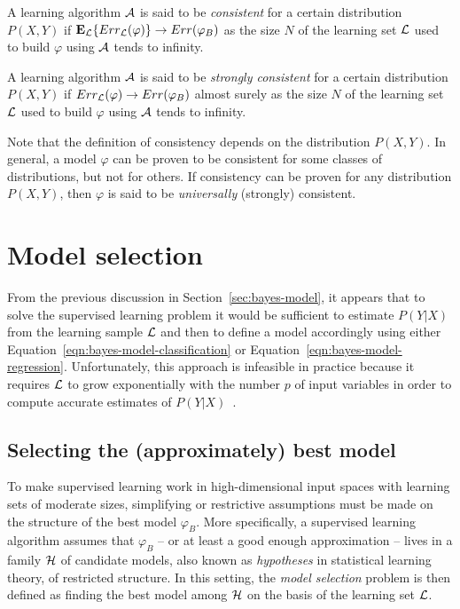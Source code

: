\begin{definition}
A learning algorithm ${\cal A}$ is said to be \emph{consistent} for a certain distribution
$P(X, Y)$ if $\mathbf{E}_{\cal L} \{ Err_{\cal L}(\varphi) \} \to Err(\varphi_B)$
as the size $N$ of the learning set ${\cal L}$ used to build $\varphi$ using ${\cal A}$ tends
to infinity.
\end{definition}

\begin{definition}
A learning algorithm ${\cal A}$ is said to be \emph{strongly consistent} for a certain distribution
$P(X, Y)$ if $Err_{\cal L}(\varphi) \to Err(\varphi_B)$ almost surely
as the size $N$ of the learning set ${\cal L}$ used to build $\varphi$ using ${\cal A}$ tends
to infinity.
\end{definition}

Note that the definition of consistency depends on the distribution $P(X, Y)$.
In general, a model $\varphi$ can be proven to be consistent for some
classes of distributions, but not for others. If consistency can be proven
for any distribution $P(X, Y)$, then $\varphi$ is said to be \textit{universally}
(strongly) consistent.


\section{Model selection}
\label{sec:model-selection}

From the previous discussion in Section~\ref{sec:bayes-model}, it appears that
to solve the supervised learning problem it would be sufficient to estimate
$P(Y|X)$ from the learning sample ${\cal L}$ and then to define a model
accordingly using either Equation~\ref{eqn:bayes-model-classification} or
Equation~\ref{eqn:bayes-model-regression}. Unfortunately, this approach is
infeasible in practice because it requires ${\cal L}$ to grow exponentially
with the number $p$ of input variables in order to compute accurate estimates of
$P(Y|X)$~\citep{geurts:2002}.

\subsection{Selecting the (approximately) best model}

To make supervised learning work in high-dimensional input spaces with learning
sets of moderate sizes, simplifying or restrictive assumptions must be made on
the structure of the best model $\varphi_B$. More specifically, a supervised
learning algorithm assumes that $\varphi_B$ -- or at least a good enough approximation
-- lives in a family ${\cal H}$ of candidate models, also known as
\textit{hypotheses} in statistical learning theory, of restricted structure. In
this setting, the \textit{model selection} problem is then defined as finding
the best model among ${\cal H}$ on the basis of the learning set ${\cal L}$.

